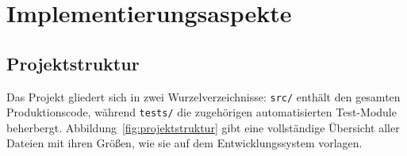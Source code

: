 ﻿\documentclass[a4paper,12pt]{report}
\theoremstyle{definition}
\begin{document}
\chapter{Implementierungsaspekte}

\section{Projektstruktur}
\label{subsec:projektstruktur}

Das Projekt gliedert sich in zwei Wurzelverzeichnisse:
\texttt{src/} enthält den gesamten Produktionscode, während
\texttt{tests/} die zugehörigen automatisierten Test-Module
beherbergt. Abbildung~\ref{fig:projektstruktur} gibt eine
vollständige Übersicht aller Dateien mit ihren Größen, wie
sie auf dem Entwicklungssystem vorlagen.

\newcommand{\treemid}{\texttt{|--~}}   %
\newcommand{\treeend}{\texttt{`--~}}   %
\end{document}
